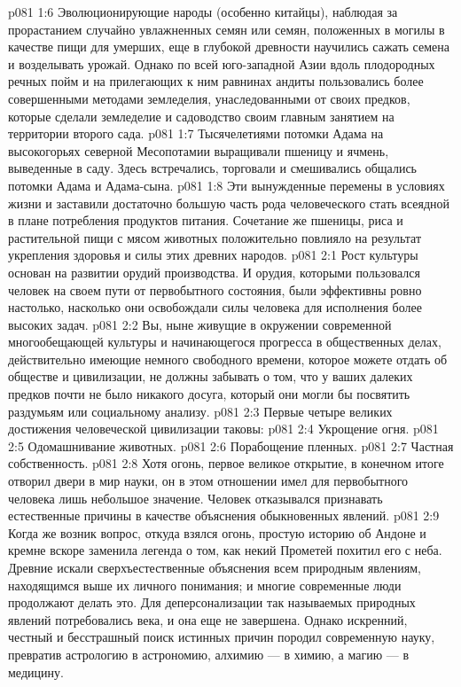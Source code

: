 \vs p081 1:6 Эволюционирующие народы (особенно китайцы), наблюдая за прорастанием случайно увлажненных семян или семян, положенных в могилы в качестве пищи для умерших, еще в глубокой древности научились сажать семена и возделывать урожай. Однако по всей юго\hyp{}западной Азии вдоль плодородных речных пойм и на прилегающих к ним равнинах андиты пользовались более совершенными методами земледелия, унаследованными от своих предков, которые сделали земледелие и садоводство своим главным занятием на территории второго сада.
\vs p081 1:7 Тысячелетиями потомки Адама на высокогорьях северной Месопотамии выращивали пшеницу и ячмень, выведенные в саду. Здесь встречались, торговали и смешивались общались потомки Адама и Адама\hyp{}сына.
\vs p081 1:8 Эти вынужденные перемены в условиях жизни и заставили достаточно большую часть рода человеческого стать всеядной в плане потребления продуктов питания. Сочетание же пшеницы, риса и растительной пищи с мясом животных положительно повлияло на результат укрепления здоровья и силы этих древних народов.
\vs p081 2:1 Рост культуры основан на развитии орудий производства. И орудия, которыми пользовался человек на своем пути от первобытного состояния, были эффективны ровно настолько, насколько они освобождали силы человека для исполнения более высоких задач.
\vs p081 2:2 Вы, ныне живущие в окружении современной многообещающей культуры и начинающегося прогресса в общественных делах, действительно имеющие немного свободного времени, которое можете отдать  об обществе и цивилизации, не должны забывать о том, что у ваших далеких предков почти не было никакого досуга, который они могли бы посвятить раздумьям или социальному анализу.
\vs p081 2:3 \pc Первые четыре великих достижения человеческой цивилизации таковы:
\vs p081 2:4 \bibnobreakspace Укрощение огня.
\vs p081 2:5 \bibnobreakspace Одомашнивание животных.
\vs p081 2:6 \bibnobreakspace Порабощение пленных.
\vs p081 2:7 \bibnobreakspace Частная собственность.
\vs p081 2:8 \pc Хотя огонь, первое великое открытие, в конечном итоге отворил двери в мир науки, он в этом отношении имел для первобытного человека лишь небольшое значение. Человек отказывался признавать естественные причины в качестве объяснения обыкновенных явлений.
\vs p081 2:9 Когда же возник вопрос, откуда взялся огонь, простую историю об Андоне и кремне вскоре заменила легенда о том, как некий Прометей похитил его с неба. Древние искали сверхъестественные объяснения всем природным явлениям, находящимся выше их личного понимания; и многие современные люди продолжают делать это. Для деперсонализации так называемых природных явлений потребовались века, и она еще не завершена. Однако искренний, честный и бесстрашный поиск истинных причин породил современную науку, превратив астрологию в астрономию, алхимию --- в химию, а магию --- в медицину.
